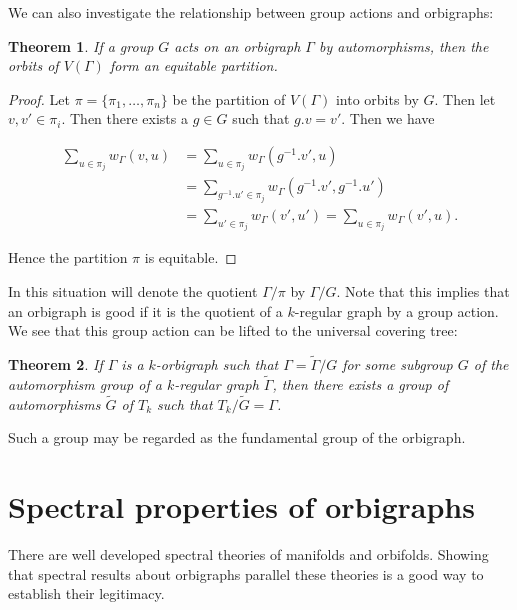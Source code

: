 \documentclass[12pt]{article}
\theoremstyle{plain}
\newtheorem{theorem}{Theorem}
\theoremstyle{definition}
\theoremstyle{remark}
\begin{document}
    We can also investigate the relationship between group actions and orbigraphs:

    \begin{theorem}\label{GroupQuotient}
      If a group $G$ acts on an orbigraph $\Gamma$ by automorphisms, then the orbits of $V(\Gamma)$ form an equitable partition.
    \end{theorem}
    \begin{proof}
      Let $\pi = \{ \pi_1, \ldots, \pi_n \}$ be the partition of $V(\Gamma)$ into orbits by $G$. Then let $v, v' \in \pi_i$. Then there exists a $g \in G$ such that $g . v = v'$. Then we have
      
      \begin{align*}
        \sum_{u \in \pi_j} w_\Gamma(v, u) &= \sum_{u \in \pi_j} w_\Gamma(g^{-1}.v', u) \\
        &= \sum_{g^{-1}.u' \in \pi_j} w_\Gamma(g^{-1}.v', g^{-1}.u') \\
        &= \sum_{u' \in \pi_j} w_\Gamma(v', u') = \sum_{u \in \pi_j} w_\Gamma(v', u).
      \end{align*}

      Hence the partition $\pi$ is equitable.
    \end{proof}

    In this situation will denote the quotient $\Gamma / \pi$ by $\Gamma / G$. Note that this implies that an orbigraph is good if it is the quotient of a $k$-regular graph by a group action. We see that this group action can be lifted to the universal covering tree:

    \begin{theorem}\label{GoodFundamentalGroup}
      If $\Gamma$ is a $k$-orbigraph such that $\Gamma = \widetilde{\Gamma}/G$ for some subgroup $G$ of the automorphism group of a $k$-regular graph $\widetilde{\Gamma}$, then there exists a group of automorphisms $\widetilde{G}$ of $T_k$ such that $T_k / \widetilde{G} = \Gamma$.
    \end{theorem}

    Such a group may be regarded as the fundamental group of the orbigraph.


\section{Spectral properties of orbigraphs}

  There are well developed spectral theories of manifolds and orbifolds. Showing that spectral results about orbigraphs parallel these theories is a good way to establish their legitimacy.
\end{document}
